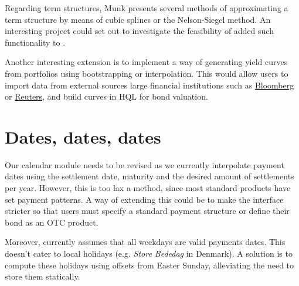 Regarding term structures, Munk\cite{cmunk} presents several methods of 
approximating
a term structure by means of cubic splines or the Nelson-Siegel method. An 
interesting project could set out to investigate the feasibility of added such 
functionality to \hql.

Another interesting extension is to implement a way of generating yield curves 
from portfolios using bootstrapping or interpolation\cite{cmunk}.
This would allow users to import data from external sources large financial
institutions such as \href{www.bloomberg.com}{Bloomberg} or
\href{www.reuters.com}{Reuters}, and build curves in HQL for bond valuation.\\

\section{Dates, dates, dates}

Our calendar module needs to be revised as we currently interpolate 
payment dates using the settlement date, maturity and the desired amount of 
settlements per year. However, this is too lax a method, since most standard 
products have set payment patterns. A way of extending this could be to make
the interface stricter so that users must specify a standard payment 
structure or define their bond as an OTC product.

Moreover, \hql currently assumes that all weekdays are valid payments dates. 
This doesn't cater to local holidays (e.g. \emph{Store Bededag} in Denmark). A 
solution is to compute these holidays using offsets from Easter Sunday, 
alleviating the need to store them statically.\\


